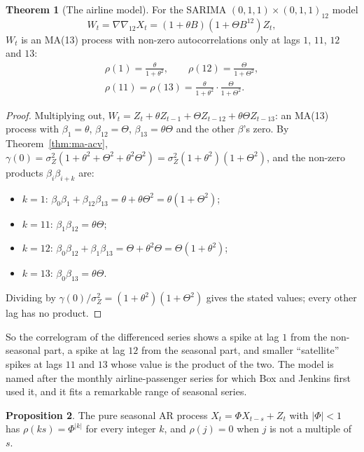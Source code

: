 \documentclass[11pt,a4paper]{article}
\theoremstyle{definition}
\newtheorem{thm}{Theorem}[subsection]
\newtheorem{prop}[thm]{Proposition}
\begin{document}
\begin{thm}[The airline model]\label{thm:airline}
For the SARIMA $(0, 1, 1) \times (0, 1, 1)_{12}$ model
\[
W_t = \nabla\nabla_{12}X_t = (1 + \theta B)(1 + \Theta B^{12})Z_t ,
\]
$W_t$ is an MA(13) process with non-zero autocorrelations only at lags $1$, $11$, $12$ and $13$:
\begin{gather*}
\rho(1) = \frac{\theta}{1 + \theta^2} , \qquad \rho(12) = \frac{\Theta}{1 + \Theta^2} , \\
\rho(11) = \rho(13) = \frac{\theta}{1 + \theta^2}\cdot\frac{\Theta}{1 + \Theta^2} .
\end{gather*}
\end{thm}

\begin{proof}
Multiplying out, $W_t = Z_t + \theta Z_{t-1} + \Theta Z_{t-12} + \theta\Theta Z_{t-13}$: an MA(13) process with $\beta_1 = \theta$, $\beta_{12} = \Theta$, $\beta_{13} = \theta\Theta$ and the other $\beta$'s zero. By
Theorem~\ref{thm:ma-acv}, $\gamma(0) = \sigma_Z^2(1 + \theta^2 + \Theta^2 + \theta^2\Theta^2) = \sigma_Z^2(1 + \theta^2)(1 + \Theta^2)$, and the non-zero products $\beta_i\beta_{i+k}$ are:
\begin{itemize}
\item $k = 1$: $\beta_0\beta_1 + \beta_{12}\beta_{13} = \theta + \theta\Theta^2 = \theta(1 + \Theta^2)$;
\item $k = 11$: $\beta_1\beta_{12} = \theta\Theta$;
\item $k = 12$: $\beta_0\beta_{12} + \beta_1\beta_{13} = \Theta + \theta^2\Theta = \Theta(1 + \theta^2)$;
\item $k = 13$: $\beta_0\beta_{13} = \theta\Theta$.
\end{itemize}
Dividing by $\gamma(0)/\sigma_Z^2 = (1 + \theta^2)(1 + \Theta^2)$ gives the stated values; every other lag has no product.
\end{proof}

So the correlogram of the differenced series shows a spike at lag $1$ from the non-seasonal part, a spike at
lag $12$ from the seasonal part, and smaller ``satellite'' spikes at lags $11$ and $13$ whose value is the product of the
two. The model is named after the monthly airline-passenger series for which Box and Jenkins first used it,
and it fits a remarkable range of seasonal series.

\begin{prop}\label{prop:seasonal-ar}
The pure seasonal AR process $X_t = \Phi X_{t-s} + Z_t$ with $|\Phi| < 1$ has $\rho(ks) = \Phi^{|k|}$ for every integer $k$, and $\rho(j) = 0$ when $j$ is not a
multiple of $s$.
\end{prop}
\end{document}
